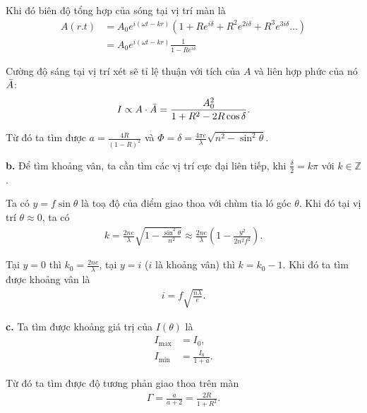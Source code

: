 Khi đó biên độ tổng hợp của sóng tại vị trí màn là
\begin{align}
    A(r.t) &= A_0 e^{i (\omega t - kr)} \left(1 + R e^{i\delta} + R^2 e^{2i \delta} + R^3 e^{3i \delta} \ldots \right)\\
    &= A_0 e^{i (\omega t - kr)} \frac{1}{1 - R e^{i \delta}}
\end{align}

Cường độ sáng tại vị trí xét sẽ tỉ lệ thuận với tích của $A$ và liên hợp phức của nó $\Bar{A}$:
\begin{align}
    I \propto A \cdot \Bar{A} = \frac{A_0^2}{1 + R^2 - 2 R\cos \delta}.
\end{align}



Từ đó ta tìm được $\displaystyle a = \frac{4R}{(1-R)^2}$ và $\displaystyle \Phi = \delta = \frac{4 \pi e}{\lambda} \sqrt{n^2 - \sin^2 \theta}$.
\vspace{1mm}

\textbf{b.} Để tìm khoảng vân, ta cần tìm các vị trí cực đại liên tiếp, khi $\displaystyle \frac{\delta}{2} = k \pi$ với $k \in \mathbb{Z}$.

Ta có $y = f \sin \theta$ là toạ độ của điểm giao thoa với chùm tia ló góc $\theta$. Khi đó tại vị trí $\theta \approx 0$, ta có
\begin{align}
    k = \frac{2ne}{\lambda}  \sqrt{1 - \frac{\sin^2 \theta}{n^2}} \approx \frac{2ne}{\lambda} \left( 1 - \frac{y^2}{2 n^2 f^2} \right). \label{45}
\end{align}

Tại $y =0$ thì $\displaystyle k_0 =  \frac{2ne}{\lambda}$, tại $y = i$ ($i$ là khoảng vân) thì $k = k_0 -1$. Khi đó ta tìm được khoảng vân là
\begin{align}
    i = f\sqrt{\frac{n\lambda}{e}}.\label{46}
\end{align}


\vspace{1.5mm}

\textbf{c.} Ta tìm được khoảng giá trị của $I(\theta)$ là 
\begin{align}
    I_{\text{max}} &= I_0, \\
    I_{\text{min}} &= \frac{I_0}{1 + a}.
\end{align}

Từ đó ta tìm được độ tương phản giao thoa trên màn
\begin{align}
    \Gamma = \frac{a}{a+2} = \frac{2R}{1+R^2}.
\end{align}

